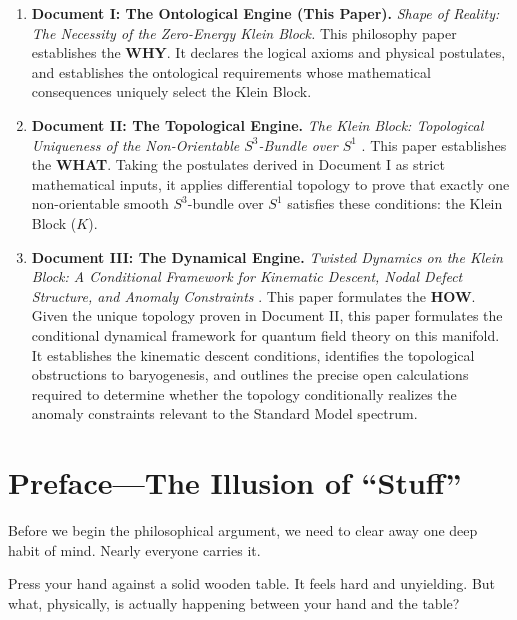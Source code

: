 \documentclass[11pt]{article}
\theoremstyle{canonstyle}
\providecommand{\Klein}{\mathcal{K}}
\def\mathcal#1{#1}%
\begin{document}
\begin{enumerate}
    \item \textbf{Document I: The Ontological Engine (This Paper).} \textit{Shape of Reality: The Necessity of the Zero-Energy Klein Block.} This philosophy paper establishes the \textbf{WHY}. It declares the logical axioms and physical postulates, and establishes the ontological requirements whose mathematical consequences uniquely select the Klein Block.
    \item \textbf{Document II: The Topological Engine.} \textit{The Klein Block: Topological Uniqueness of the Non-Orientable $S^3$-Bundle over $S^1$} \cite{CanonWhat}. This paper establishes the \textbf{WHAT}. Taking the postulates derived in Document I as strict mathematical inputs, it applies differential topology to prove that exactly one non-orientable smooth $S^3$-bundle over $S^1$ satisfies these conditions: the Klein Block ($\Klein$).
    \item \textbf{Document III: The Dynamical Engine.} \textit{Twisted Dynamics on the Klein Block: A Conditional Framework for Kinematic Descent, Nodal Defect Structure, and Anomaly Constraints} \cite{CanonHow}. This paper formulates the \textbf{HOW}. Given the unique topology proven in Document II, this paper formulates the conditional dynamical framework for quantum field theory on this manifold. It establishes the kinematic descent conditions, identifies the topological obstructions to baryogenesis, and outlines the precise open calculations required to determine whether the topology conditionally realizes the anomaly constraints relevant to the Standard Model spectrum.
\end{enumerate}

\newpage
{}
\tableofcontents

\newpage
{}
\setcounter{page}{1}

\section*{Preface---The Illusion of ``Stuff''}

Before we begin the philosophical argument, we need to clear away one deep habit of mind. Nearly everyone carries it.

\begin{reflect}
Press your hand against a solid wooden table. It feels hard and unyielding. But what, physically, is actually happening between your hand and the table?
\end{reflect}
\end{document}
